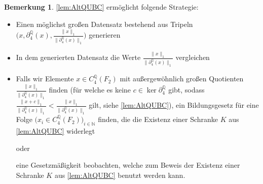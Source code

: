 \documentclass[a4paper,twoside,10pt]{scrreprt}
\newcommand{\N}{\mathbb{N}}
\newcommand{\Q}{\mathbb{Q}}
\theoremstyle{definition}
\newtheorem{bemerkung}[satz]{Bemerkung}
\begin{document}
\begin{bemerkung}\label{bem:strategy}
\cref{lem:AltQUBC} ermöglicht folgende Strategie: 
\begin{itemize}
\item Einen möglichst großen Datensatz bestehend aus Tripeln $\biggl(x,\partial_4^{\Q}(x),\frac{\|x\|_1}{\|\partial_4^{\Q}(x)\|_1}\biggr)$ generieren
\item In dem generierten Datensatz die Werte $\frac{\|x\|_1}{\|\partial_4^{\Q}(x)\|_1}$ vergleichen
\item Falls wir Elemente $x\in C_4^{\Q}(F_2)$ mit außergewöhnlich großen Quotienten $\frac{\|x\|_1}{\|\partial_4^{\Q}(x)\|_1}$ finden (für welche es keine $c\in \ker\partial_4^{\Q}$ gibt, sodass $\frac{\|x+c\|_1}{\|\partial_4^{\Q}(x)\|_1}<\frac{\|x\|_1}{\|\partial_4^{\Q}(x)\|_1}$ gilt, siehe \cref{lem:AltQUBC}), ein Bildungsgesetz für eine Folge $\bigl(x_i\in C_4^{\Q}(F_2)\bigr)_{i\in\N}$ finden, die die Existenz einer Schranke $K$ aus \cref{lem:AltQUBC} widerlegt \par oder \par eine Gesetzmäßigkeit beobachten, welche zum Beweis der Existenz einer Schranke $K$ aus \cref{lem:AltQUBC} benutzt werden kann.
\end{itemize}
\end{bemerkung}
\end{document}
